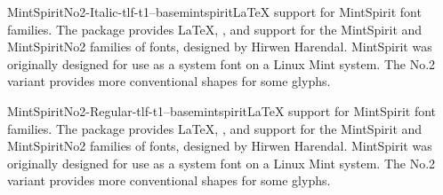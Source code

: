 \documentclass{ddltxtyp}
\begin{document}
\begin{package}{MintSpiritNo2-Italic-tlf-t1--base}{mintspirit}{{\LaTeX} support for MintSpirit font families.}
The package provides {\LaTeX}, {\pdfLaTeX}, {\XeLaTeX} and {\LuaLaTeX}
support for the MintSpirit and MintSpiritNo2 families of fonts,
designed by Hirwen Harendal. MintSpirit was originally designed
for use as a system font on a Linux Mint system. The No.2
variant provides more conventional shapes for some glyphs.
\end{package}
\begin{package}{MintSpiritNo2-Regular-tlf-t1--base}{mintspirit}{{\LaTeX} support for MintSpirit font families.}
The package provides {\LaTeX}, {\pdfLaTeX}, {\XeLaTeX} and {\LuaLaTeX}
support for the MintSpirit and MintSpiritNo2 families of fonts,
designed by Hirwen Harendal. MintSpirit was originally designed
for use as a system font on a Linux Mint system. The No.2
variant provides more conventional shapes for some glyphs.
\end{package}

\end{document}
